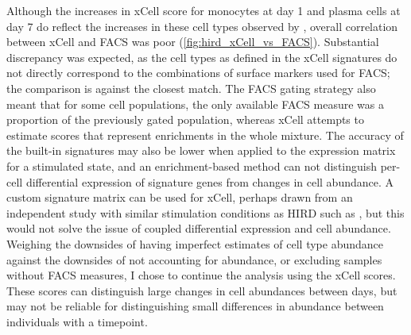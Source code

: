 Although the increases in xCell score for monocytes at day 1 and plasma cells at day 7 do reflect the increases in these cell types observed by \textcite{sobolev2016AdjuvantedInfluenzaH1N1Vaccination}, overall correlation between xCell and \gls{FACS} was poor (\cref{fig:hird_xCell_vs_FACS}).
Substantial discrepancy was expected, as the cell types as defined in the xCell signatures do not directly correspond to the combinations of surface markers used for \gls{FACS}; the comparison is against the closest match.
The \gls{FACS} gating strategy also meant that for some cell populations, the only available \gls{FACS} measure was a proportion of the previously gated population,
whereas xCell attempts to estimate scores that represent enrichments in the whole mixture.
The accuracy of the built-in signatures may also be lower when applied to the expression matrix for a stimulated state,
and an enrichment-based method can not distinguish per-cell differential expression of signature genes from changes in cell abundance.
A custom signature matrix can be used for xCell, perhaps drawn from an independent study with similar stimulation conditions as \gls{HIRD} such as \textcite{franco2013IntegrativeGenomicAnalysis}, but this would not solve the issue of coupled differential expression and cell abundance.
Weighing the downsides of having imperfect estimates of cell type abundance against the downsides of not accounting for abundance, or excluding samples without \gls{FACS} measures, I chose to continue the analysis using the xCell scores.
These scores can distinguish large changes in cell abundances between days, but may not be reliable for distinguishing small differences in abundance between individuals with a timepoint. 

